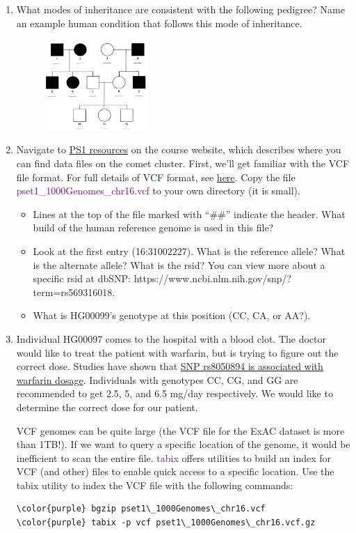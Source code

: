 \documentclass[12pt]{article}
\begin{document}
\begin{enumerate}
\item What modes of inheritance are consistent with the following pedigree? Name an example human condition that follows this mode of inheritance.

\begin{figure}[h!]
\centering
\includegraphics[width=150px]{pset1dominant.png}
\end{figure}

\item Navigate to \href{https://gymreklab.github.io/teaching/personal\_genomics/ps1\_resources.html}{PS1 resources} on the course website, which describes where you can find data files on the comet cluster. First, we'll get familiar with the VCF file format. For full details of VCF format, see \href{https://samtools.github.io/hts-specs/VCFv4.2.pdf}{here}. Copy the file \textcolor{purple}{pset1\_1000Genomes\_chr16.vcf} to your own directory (it is small).
\begin{itemize}
\item Lines at the top of the file marked with ``\#\#'' indicate the header. What build of the human reference genome is used in this file?
\item Look at the first entry (16:31002227). What is the reference allele? What is the alternate allele? What is the rsid? You can view more about a specific rsid at dbSNP: https://www.ncbi.nlm.nih.gov/snp/?term=rs569316018.
\item What is HG00099's genotype at this position (CC, CA, or AA?).
\end{itemize}

\item Individual HG00097 comes to the hospital with a blood clot. The doctor would like to treat the patient with warfarin, but is trying to figure out the correct dose. Studies have shown that \href{https://www.snpedia.com/index.php/Rs8050894}{SNP rs8050894 is associated with warfarin dosage}. Individuals with genotypes CC, CG, and GG are recommended to get 2.5, 5, and 6.5 mg/day respectively. We would like to determine the correct dose for our patient.

VCF genomes can be quite large (the VCF file for the ExAC dataset is more than 1TB!). If we want to query a specific location of the genome, it would be inefficient to scan the entire file. \textcolor{purple}{tabix} offers utilities to build an index for VCF (and other) files to enable quick access to a specific location. Use the tabix utility to index the VCF file with the following commands:
\begin{Verbatim}[commandchars=\\\{\}]
\color{purple} bgzip pset1\_1000Genomes\_chr16.vcf
\color{purple} tabix -p vcf pset1\_1000Genomes\_chr16.vcf.gz
\end{Verbatim}


\end{enumerate}
\end{document}
